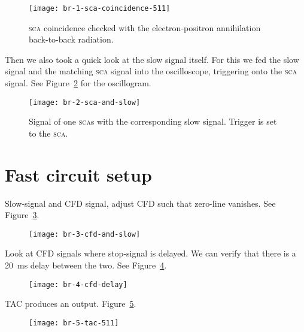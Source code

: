 \documentclass[11pt, english, fleqn, DIV=15, headinclude, BCOR=2cm]{scrreprt}
\begin{document}
\begin{figure}
    \centering
    \texttt{[image: br-1-sca-coincidence-511]}
    \caption{%
        \textsc{sca} coincidence checked with the electron-positron
        annihilation back-to-back radiation.
    }
    \label{fig:1-sca-coincidence-511}
\end{figure}

Then we also took a quick look at the slow signal itself. For this we fed the
slow signal and the matching \textsc{sca} signal into the oscilloscope,
triggering onto the \textsc{sca} signal. See Figure~\ref{fig:2-sca-and-slow}
for the oscillogram.


\begin{figure}
    \centering
    \texttt{[image: br-2-sca-and-slow]}
    \caption{%
        Signal of one \textsc{sca}s with the corresponding slow signal. Trigger
        is set to the \textsc{sca}.
    }
    \label{fig:2-sca-and-slow}
\end{figure}

\section{Fast circuit setup}

Slow-signal and CFD signal, adjust CFD such that zero-line vanishes. See
Figure~\ref{fig:3-cfd-and-slow}.

\begin{figure}
    \centering
    \texttt{[image: br-3-cfd-and-slow]}
    \caption{%
    }
    \label{fig:3-cfd-and-slow}
\end{figure}

Look at CFD signals where stop-signal is delayed. We can verify that there is a
\SI{20}{\milli\second} delay between the two. See Figure~\ref{fig:4-cfd-delay}.

\begin{figure}
    \centering
    \texttt{[image: br-4-cfd-delay]}
    \caption{%
    }
    \label{fig:4-cfd-delay}
\end{figure}

TAC produces an output. Figure~\ref{fig:5-tac-511}.

\begin{figure}
    \centering
    \texttt{[image: br-5-tac-511]}
    \caption{%
    }
    \label{fig:5-tac-511}
\end{figure}
\end{document}
